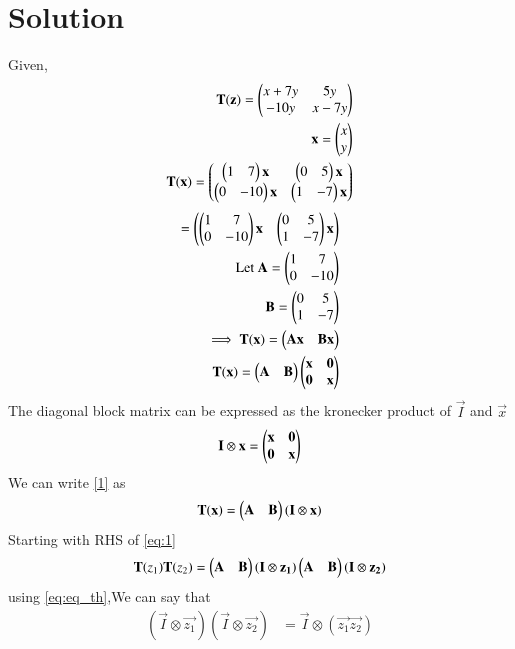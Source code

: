 \documentclass[journal,12pt,twocolumn]{IEEEtran}
\begin{document}
\section{Solution}
Given,
\begin{align}
 \mathbf{T}(\mathbf{z})=\begin{pmatrix}x+7y&5y\\-10y&x-7y\end{pmatrix}\\
 \mathbf{x}=\begin{pmatrix}x\\y\end{pmatrix}\\
 \mathbf{T}(\mathbf{x})=\begin{pmatrix}\begin{pmatrix}1&7\end{pmatrix}\mathbf{x}&\begin{pmatrix}0&5\end{pmatrix}\mathbf{x}\\\begin{pmatrix}0&-10\end{pmatrix}\mathbf{x}&\begin{pmatrix}1&-7\end{pmatrix}\mathbf{x}\end{pmatrix}\end{align}\begin{align}
 =\begin{pmatrix}\begin{pmatrix}1&7\\0&-10\end{pmatrix}\mathbf{x}&\begin{pmatrix}0&5\\1&-7\end{pmatrix}\mathbf{x}\end{pmatrix}\\
 \text{Let } \mathbf{A}=\begin{pmatrix}1&7\\0&-10\end{pmatrix}\\
 \mathbf{B}=\begin{pmatrix}0&5\\1&-7\end{pmatrix}\\
 \implies  \mathbf{T}(\mathbf{x})=\begin{pmatrix}\mathbf{A}\mathbf{x}&\mathbf{B}\mathbf{x}\end{pmatrix}\\
  \mathbf{T}(\mathbf{x})=\begin{pmatrix}\mathbf{A}&\mathbf{B}\end{pmatrix}\begin{pmatrix}\mathbf{x}&\mathbf{0}\\\mathbf{0}&\mathbf{x}\end{pmatrix}\label{1}
\end{align}
The diagonal block matrix can be expressed as the kronecker product of $\vec{I}$ and $\vec{x}$
\begin{align}
    \mathbf{I}\otimes\mathbf{x}=\begin{pmatrix}\mathbf{x}&\mathbf{0}\\\mathbf{0}&\mathbf{x}\end{pmatrix}
\end{align}
We can write \eqref{1} as
\begin{align}
    \mathbf{T} (\mathbf{x}) = \begin{pmatrix}\mathbf{A} & \mathbf{B}\end{pmatrix} (\mathbf{I} \otimes \mathbf{x})
\end{align}
Starting with RHS of \eqref{eq:1}
\begin{align}
    \mathbf{T}(z_1)\mathbf{T}(z_2)= \begin{pmatrix}\mathbf{A} & \mathbf{B}\end{pmatrix} (\mathbf{I} \otimes \mathbf{z_1})\begin{pmatrix}\mathbf{A} & \mathbf{B}\end{pmatrix} (\mathbf{I} \otimes \mathbf{z_2})
\end{align}
using \eqref{eq:eq_th},We can say that 
\begin{align}
    (\vec{I} \otimes\vec{z_1}) (\vec{I} \otimes\vec{z_2})&=
    \vec{I} \otimes (\vec{z_1} \vec{z_2})
\end{align}
\end{document}
